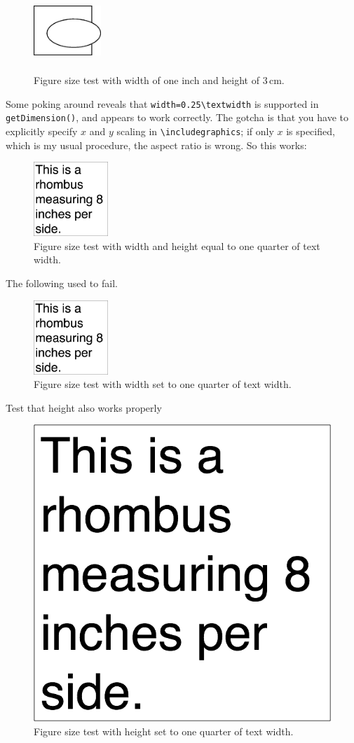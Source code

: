 \documentclass{article}
\begin{document}
\begin{figure}
\begin{center}
\includegraphics[width=1in,height=3cm]{fig_oval.png}
\caption{Figure size test with width of one inch and height of 3\,cm.} 
\end{center}
\end{figure}

Some poking around reveals that \verb#width=0.25\textwidth# is supported 
in \verb#getDimension()#, and appears to work correctly.  
The gotcha is that you have to explicitly specify $x$ and $y$ scaling 
in \verb#\includegraphics#; if only $x$ is specified, which is my usual 
procedure, the aspect ratio is wrong. So this works:

\begin{figure}
\begin{center}
\includegraphics[width=0.25\textwidth,height=0.25\textwidth]{fig_testf.png}
\end{center}
\caption{Figure size test with width and height equal to one quarter of text width.} 
\end{figure}

The following used to fail.

\begin{figure}
\begin{center}
\includegraphics[width=0.25\textwidth]{fig_testf.png}
\caption{Figure size test with width set to one quarter of text width.} 
\end{center}
\end{figure}

Test that height also works properly
\begin{figure}
\begin{center}
\includegraphics[height=0.25\textwidth]{fig_testf.png}
\caption{Figure size test with height set to one quarter of text width.} 
\end{center}
\end{figure}
\end{document}
